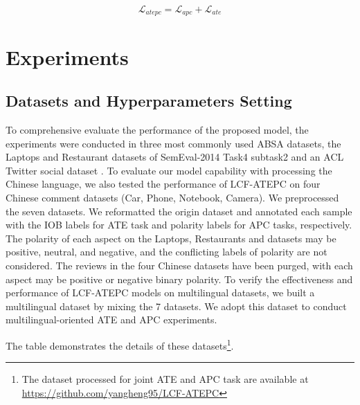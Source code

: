 \documentclass[a4paper,fleqn]{cas-sc}
\begin{document}
\begin{equation}
\mathcal{L}_{atepc} = \mathcal{L}_{apc}+ \mathcal{L}_{ate}
\end{equation}

\section{Experiments}

\subsection{Datasets and Hyperparameters Setting}


To comprehensive evaluate the performance of the proposed model, the experiments were conducted in three most commonly used ABSA datasets, the Laptops and Restaurant datasets of SemEval-2014 Task4 subtask2 \cite{pontiki2014semeval} and an ACL Twitter social dataset \cite{dong2014adaptive}. To evaluate our model capability with processing the Chinese language, we also tested the performance of LCF-ATEPC on four Chinese comment datasets \cite{che2015sentence, zhao2015principal, peng2018learning} (Car, Phone, Notebook, Camera). We preprocessed the seven datasets. We reformatted the origin dataset and annotated each sample with the IOB labels for ATE task and polarity labels for APC tasks, respectively. The polarity of each aspect on the Laptops, Restaurants and datasets may be positive, neutral, and negative, and the conflicting labels of polarity are not considered. The reviews in the four Chinese datasets have been purged, with each aspect may be positive or negative binary polarity. To verify the effectiveness and performance of LCF-ATEPC models on multilingual datasets, we built a multilingual dataset by mixing the 7 datasets. We adopt this dataset to conduct multilingual-oriented ATE and APC experiments.


The table demonstrates the details of these datasets\footnote{The dataset processed for joint ATE and APC task are available at \url{https://github.com/yangheng95/LCF-ATEPC}}. 
\end{document}
